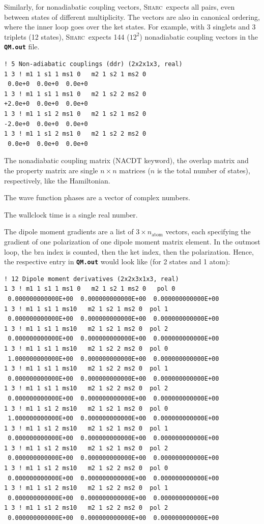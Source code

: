 \documentclass[a4paper,10pt,DIV=15,openany,twoside=false]{scrbook}
\newcommand{\sharc}{\textsc{Sharc}}
\newcommand{\ttt}[1]{\textbf{\texttt{#1}}}
\newenvironment{example}{
  \setlength{\OuterFrameSep}{3pt}
  \vspace{0mm}
  \definecolor{shadecolor}{HTML}{E4F4FF}
  \begin{shaded}
}{
  \end{shaded}
}
\begin{document}
Similarly, for nonadiabatic coupling vectors, \sharc\ expects all pairs, even between states of different multiplicity. The vectors are also in canonical ordering, where the inner loop goes over the ket states. For example, with 3 singlets and 3 triplets (12 states), \sharc\ expects 144 ($12^2$) nonadiabatic coupling vectors in the \ttt{QM.out} file.
\begin{example}
  \begin{verbatim}
! 5 Non-adiabatic couplings (ddr) (2x2x1x3, real)
1 3 ! m1 1 s1 1 ms1 0   m2 1 s2 1 ms2 0
 0.0e+0  0.0e+0  0.0e+0 
1 3 ! m1 1 s1 1 ms1 0   m2 1 s2 2 ms2 0
+2.0e+0  0.0e+0  0.0e+0 
1 3 ! m1 1 s1 2 ms1 0   m2 1 s2 1 ms2 0
-2.0e+0  0.0e+0  0.0e+0 
1 3 ! m1 1 s1 2 ms1 0   m2 1 s2 2 ms2 0
 0.0e+0  0.0e+0  0.0e+0 
\end{verbatim}
\end{example}

The nonadiabatic coupling matrix (NACDT keyword), the overlap matrix and the property matrix are single $n\times n$ matrices ($n$ is the total number of states), respectively, like the Hamiltonian. 

The wave function phases are a vector of complex numbers.

The wallclock time is a single real number. 

The dipole moment gradients are a list of $3\times n_\text{atom}$ vectors, each specifying the gradient of one polarization of one dipole moment matrix element. In the outmost loop, the bra index is counted, then the ket index, then the polarization. Hence, the respective entry in \ttt{QM.out} would look like (for 2 states and 1 atom):
\begin{example}
  \begin{verbatim}
! 12 Dipole moment derivatives (2x2x3x1x3, real)
1 3 ! m1 1 s1 1 ms1 0   m2 1 s2 1 ms2 0   pol 0
 0.000000000000E+00  0.000000000000E+00  0.000000000000E+00 
1 3 ! m1 1 s1 1 ms10   m2 1 s2 1 ms2 0  pol 1
 0.000000000000E+00  0.000000000000E+00  0.000000000000E+00 
1 3 ! m1 1 s1 1 ms10   m2 1 s2 1 ms2 0  pol 2
 0.000000000000E+00  0.000000000000E+00  0.000000000000E+00 
1 3 ! m1 1 s1 1 ms10   m2 1 s2 2 ms2 0  pol 0
 1.000000000000E+00  0.000000000000E+00  0.000000000000E+00 
1 3 ! m1 1 s1 1 ms10   m2 1 s2 2 ms2 0  pol 1
 0.000000000000E+00  0.000000000000E+00  0.000000000000E+00 
1 3 ! m1 1 s1 1 ms10   m2 1 s2 2 ms2 0  pol 2
 0.000000000000E+00  0.000000000000E+00  0.000000000000E+00 
1 3 ! m1 1 s1 2 ms10   m2 1 s2 1 ms2 0  pol 0
 1.000000000000E+00  0.000000000000E+00  0.000000000000E+00 
1 3 ! m1 1 s1 2 ms10   m2 1 s2 1 ms2 0  pol 1
 0.000000000000E+00  0.000000000000E+00  0.000000000000E+00 
1 3 ! m1 1 s1 2 ms10   m2 1 s2 1 ms2 0  pol 2
 0.000000000000E+00  0.000000000000E+00  0.000000000000E+00 
1 3 ! m1 1 s1 2 ms10   m2 1 s2 2 ms2 0  pol 0
 0.000000000000E+00  0.000000000000E+00  0.000000000000E+00 
1 3 ! m1 1 s1 2 ms10   m2 1 s2 2 ms2 0  pol 1
 0.000000000000E+00  0.000000000000E+00  0.000000000000E+00 
1 3 ! m1 1 s1 2 ms10   m2 1 s2 2 ms2 0  pol 2
 0.000000000000E+00  0.000000000000E+00  0.000000000000E+00 
\end{verbatim}
\end{example}
\end{document}
